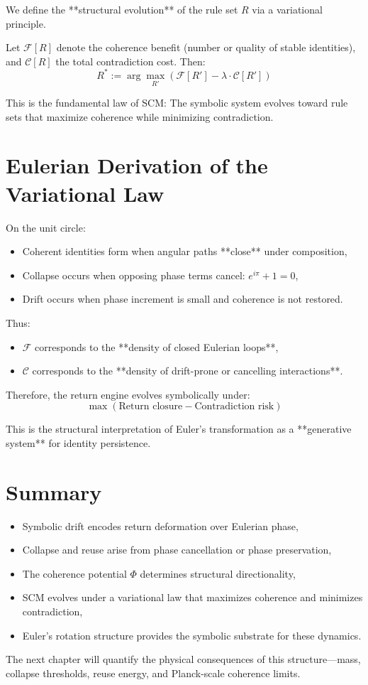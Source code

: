 We define the **structural evolution** of the rule set $R$ via a variational principle.

\begin{definition}
Let $\mathcal{F}[R]$ denote the coherence benefit (number or quality of stable identities), and $\mathcal{C}[R]$ the total contradiction cost. Then:
\[
R^* := \arg\max_{R'} \left( \mathcal{F}[R'] - \lambda \cdot \mathcal{C}[R'] \right)
\]
\end{definition}

\noindent This is the fundamental law of SCM:  
The symbolic system evolves toward rule sets that maximize coherence while minimizing contradiction.

\section{Eulerian Derivation of the Variational Law}

On the unit circle:
\begin{itemize}
    \item Coherent identities form when angular paths **close** under composition,
    \item Collapse occurs when opposing phase terms cancel: \( e^{i\pi} + 1 = 0 \),
    \item Drift occurs when phase increment is small and coherence is not restored.
\end{itemize}

Thus:
\begin{itemize}
    \item $\mathcal{F}$ corresponds to the **density of closed Eulerian loops**,
    \item $\mathcal{C}$ corresponds to the **density of drift-prone or cancelling interactions**.
\end{itemize}

Therefore, the return engine evolves symbolically under:
\[
\max \left( \text{Return closure} - \text{Contradiction risk} \right)
\]

This is the structural interpretation of Euler's transformation as a **generative system** for identity persistence.

\section{Summary}

\begin{itemize}
    \item Symbolic drift encodes return deformation over Eulerian phase,
    \item Collapse and reuse arise from phase cancellation or phase preservation,
    \item The coherence potential $\Phi$ determines structural directionality,
    \item SCM evolves under a variational law that maximizes coherence and minimizes contradiction,
    \item Euler’s rotation structure provides the symbolic substrate for these dynamics.
\end{itemize}

The next chapter will quantify the physical consequences of this structure—mass, collapse thresholds, reuse energy, and Planck-scale coherence limits.
